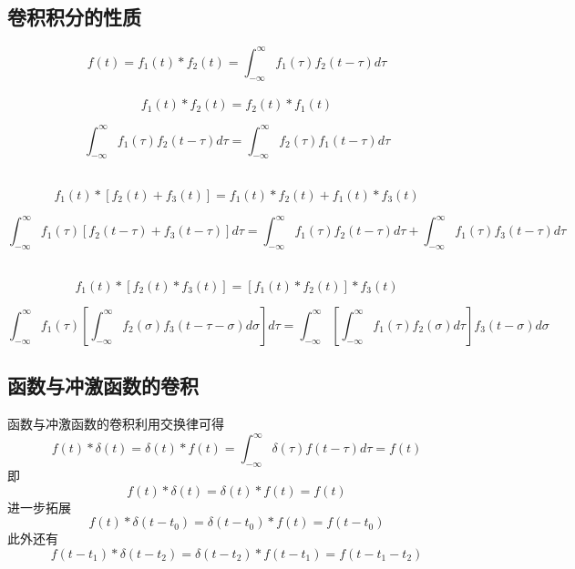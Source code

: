 \subsection{卷积积分的性质}
\begin{equation}
    f(t)=f_1(t)*f_2(t)=\int_{-\infty}^{\infty}f_1(\tau)f_2(t-\tau)d\tau
\end{equation}
\\
\begin{equation}
    f_1(t)*f_2(t)=f_2(t)*f_1(t)
\end{equation}
\begin{note}
\begin{equation*}
    \int_{-\infty}^{\infty}f_1(\tau)f_2(t-\tau)d\tau = \int_{-\infty}^{\infty}f_2(\tau)f_1(t-\tau)d\tau
\end{equation*}
\end{note}
\\
\begin{equation}
    f_1(t)*[f_2(t)+f_3(t)]=f_1(t)*f_2(t)+f_1(t)*f_3(t)
\end{equation} 
\begin{note}
\begin{equation*}
    \int_{-\infty}^{\infty}f_1(\tau)[f_2(t-\tau)+f_3(t-\tau)]d\tau = \int_{-\infty}^{\infty}f_1(\tau)f_2(t-\tau)d\tau + \int_{-\infty}^{\infty}f_1(\tau)f_3(t-\tau)d\tau
\end{equation*}
\end{note}
\\
\begin{equation}
    f_1(t)*[f_2(t)*f_3(t)]=[f_1(t)*f_2(t)]*f_3(t)
\end{equation}
\begin{note}
\begin{equation*}
    \int_{-\infty}^{\infty}f_1(\tau)[\int_{-\infty}^{\infty}f_2(\sigma)f_3(t-\tau-\sigma)d\sigma]d\tau = \int_{-\infty}^{\infty}[\int_{-\infty}^{\infty}f_1(\tau)f_2(\sigma)d\tau]f_3(t-\sigma)d\sigma
\end{equation*}
\end{note}  

\subsection{函数与冲激函数的卷积}
函数与冲激函数的卷积利用交换律可得
\[
f(t)*\delta(t)=\delta(t)*f(t)=\int_{-\infty}^{\infty}\delta(\tau)f(t-\tau)d\tau=f(t)
\]
即
\[
f(t)*\delta(t)=\delta(t)*f(t)=f(t)
\]
进一步拓展
\[
f(t)*\delta(t-t_0)=\delta(t-t_0)*f(t)=f(t-t_0)
\]
此外还有
\[
f(t-t_1)*\delta(t-t_2)=\delta(t-t_2)*f(t-t_1)=f(t-t_1-t_2)
\]
